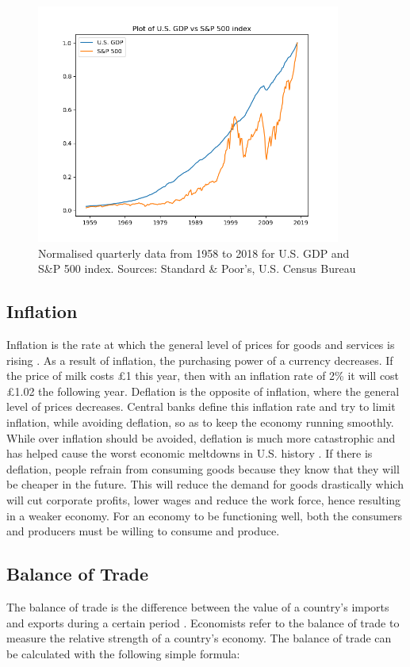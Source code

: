 \documentclass{UoYCSproject}
\begin{document}
\begin{figure}[h]
\includegraphics[width=10cm]{GDPvsSP500}
\centering
\caption{Normalised quarterly data from 1958 to 2018 for U.S. GDP and S\&P 500 index. Sources: Standard \& Poor's, U.S. Census Bureau} 
\label{fig:gdpvssp500}
\end{figure}

\subsection{Inflation}
Inflation is the rate at which the general level of prices for goods and services is rising \cite{inflation}. As a result of inflation, the purchasing power of a currency decreases. If the price of milk costs \pounds 1 this year, then with an inflation rate of 2\% it will cost \pounds 1.02 the following year. Deflation is the opposite of inflation, where the general level of prices decreases. Central banks define this inflation rate and try to limit inflation, while avoiding deflation, so as to keep the economy running smoothly. While over inflation should be avoided, deflation is much more catastrophic and has helped cause the worst economic meltdowns in U.S. history \cite{fleckenstein2013deflation}. If there is deflation, people refrain from consuming goods because they know that they will be cheaper in the future. This will reduce the demand for goods drastically which will cut corporate profits, lower wages and reduce the work force, hence resulting in a weaker economy. For an economy to be functioning well, both the consumers and producers must be willing to consume and produce. 

\subsection{Balance of Trade}
The balance of trade is the difference between the value of a country's imports and exports during a certain period \cite{balanceoftrade}. Economists refer to the balance of trade to measure the relative strength of a country's economy. The balance of trade can be calculated with the following simple formula:
\end{document}
